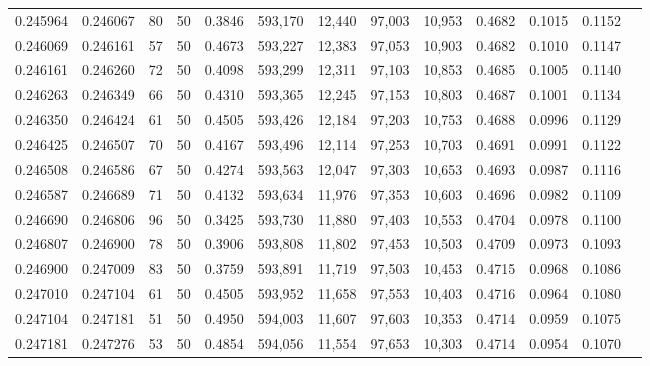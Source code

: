 \begin{tabular}{rrrrrrrrrrrrr}
0.245964 & 0.246067 &    80 &  50 &                                     0.3846 & 593,170 &  12,440 &  97,003 &  10,953 & 0.4682 & 0.1015 & 0.1152 \\
0.246069 & 0.246161 &    57 &  50 &                                     0.4673 & 593,227 &  12,383 &  97,053 &  10,903 & 0.4682 & 0.1010 & 0.1147 \\
0.246161 & 0.246260 &    72 &  50 &                                     0.4098 & 593,299 &  12,311 &  97,103 &  10,853 & 0.4685 & 0.1005 & 0.1140 \\
0.246263 & 0.246349 &    66 &  50 &                                     0.4310 & 593,365 &  12,245 &  97,153 &  10,803 & 0.4687 & 0.1001 & 0.1134 \\
0.246350 & 0.246424 &    61 &  50 &                                     0.4505 & 593,426 &  12,184 &  97,203 &  10,753 & 0.4688 & 0.0996 & 0.1129 \\
0.246425 & 0.246507 &    70 &  50 &                                     0.4167 & 593,496 &  12,114 &  97,253 &  10,703 & 0.4691 & 0.0991 & 0.1122 \\
0.246508 & 0.246586 &    67 &  50 &                                     0.4274 & 593,563 &  12,047 &  97,303 &  10,653 & 0.4693 & 0.0987 & 0.1116 \\
0.246587 & 0.246689 &    71 &  50 &                                     0.4132 & 593,634 &  11,976 &  97,353 &  10,603 & 0.4696 & 0.0982 & 0.1109 \\
0.246690 & 0.246806 &    96 &  50 &                                     0.3425 & 593,730 &  11,880 &  97,403 &  10,553 & 0.4704 & 0.0978 & 0.1100 \\
0.246807 & 0.246900 &    78 &  50 &                                     0.3906 & 593,808 &  11,802 &  97,453 &  10,503 & 0.4709 & 0.0973 & 0.1093 \\
0.246900 & 0.247009 &    83 &  50 &                                     0.3759 & 593,891 &  11,719 &  97,503 &  10,453 & 0.4715 & 0.0968 & 0.1086 \\
0.247010 & 0.247104 &    61 &  50 &                                     0.4505 & 593,952 &  11,658 &  97,553 &  10,403 & 0.4716 & 0.0964 & 0.1080 \\
0.247104 & 0.247181 &    51 &  50 &                                     0.4950 & 594,003 &  11,607 &  97,603 &  10,353 & 0.4714 & 0.0959 & 0.1075 \\
0.247181 & 0.247276 &    53 &  50 &                                     0.4854 & 594,056 &  11,554 &  97,653 &  10,303 & 0.4714 & 0.0954 & 0.1070 \\

\end{tabular}
